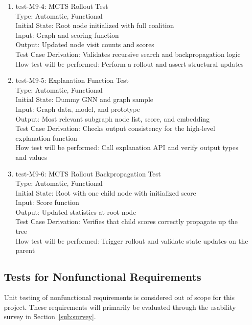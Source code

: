 \documentclass[12pt, titlepage]{article}
\begin{document}
\begin{enumerate}
\item{test-M9-4: MCTS Rollout Test\\}
Type: Automatic, Functional \\
Initial State: Root node initialized with full coalition \\
Input: Graph and scoring function \\
Output: Updated node visit counts and scores \\
Test Case Derivation: Validates recursive search and backpropagation logic \\
How test will be performed: Perform a rollout and assert structural updates

\item{test-M9-5: Explanation Function Test\\}
Type: Automatic, Functional \\
Initial State: Dummy GNN and graph sample \\
Input: Graph data, model, and prototype \\
Output: Most relevant subgraph node list, score, and embedding \\
Test Case Derivation: Checks output consistency for the high-level explanation function \\
How test will be performed: Call explanation API and verify output types and values


\item{test-M9-6: MCTS Rollout Backpropagation Test\\}
Type: Automatic, Functional \\
Initial State: Root with one child node with initialized score \\
Input: Score function \\
Output: Updated statistics at root node \\
Test Case Derivation: Verifies that child scores correctly propagate up the tree \\
How test will be performed: Trigger rollout and validate state updates on the parent
\end{enumerate}


\subsection{Tests for Nonfunctional Requirements}
Unit testing of nonfunctional requirements is considered out of scope for this project. These requirements will primarily be evaluated through the usability survey in Section~\ref{sub:survey}.
\end{document}
